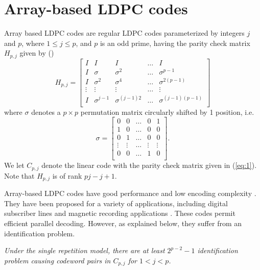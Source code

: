 \section{Array-based LDPC codes}\label{ldpc}

Array based LDPC codes are regular LDPC codes parameterized by
integers $j$ and $p$, where $1 \le j \leq p$, and $p$ is an odd
prime, having the parity check matrix $H_{p,j}$ given by
(\cite{mittel:02}) \small\begin{equation}\label{eq:1}
H_{p,j}=\left[\begin{array}{ccccc}
I & I & I & \ldots & I\\
I & \sigma & \sigma^2 & \ldots &\sigma^{p-1}\\
I & \sigma^2 & \sigma^4 & \ldots &\sigma^{2(p-1)}\\
\vdots & \vdots & \vdots & \ldots & \vdots \\
I & \sigma^{j-1} & \sigma^{(j-1)2} & \ldots &\sigma^{(j-1)(p-1)}\\
\end{array}
\right]
\end{equation}\normalsize
where $\sigma$ denotes a $p \times p$ permutation matrix
circularly shifted by 1 position, i.e. \small
\begin{equation}
\sigma=\left[\begin{array}{ccccc}
0 & 0 & \ldots & 0 & 1\\
1 & 0 & \ldots & 0 & 0\\
0 & 1 & \ldots & 0 & 0\\
\vdots & \vdots & \ldots & \vdots & \vdots\\
0 & 0 & \ldots & 1 & 0\\
\end{array}
\right].
\end{equation}
\normalsize We let $C_{p,j}$ denote the linear code with the
parity check matrix given in (\ref{eq:1}). Note that $H_{p,j}$ is
of rank $pj - j +1$.

Array-based LDPC codes have good performance \cite{fan} and low
encoding complexity \cite{mittel:02}. They have been proposed for
a variety of applications, including digital subscriber lines
\cite{ibm:02} and magnetic recording applications \cite{kumar:04}.
These codes permit efficient parallel decoding. However, as
explained below, they suffer from an identification problem.

\begin{lemma} \textit{Under the single repetition model,
there are at least $2^{p-2}-1$ identification problem causing
codeword pairs in $C_{p,j}$ for $1< j <p$.}\end{lemma}

